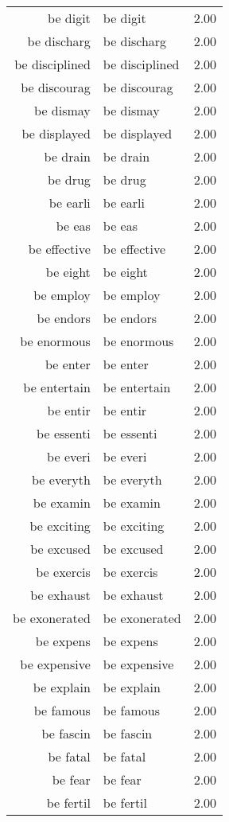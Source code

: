 \begin{table}[ht]
\begin{tabular}{rlr}
  be digit & be digit & 2.00 \\ 
  be discharg & be discharg & 2.00 \\ 
  be disciplined & be disciplined & 2.00 \\ 
  be discourag & be discourag & 2.00 \\ 
  be dismay & be dismay & 2.00 \\ 
  be displayed & be displayed & 2.00 \\ 
  be drain & be drain & 2.00 \\ 
  be drug & be drug & 2.00 \\ 
  be earli & be earli & 2.00 \\ 
  be eas & be eas & 2.00 \\ 
  be effective & be effective & 2.00 \\ 
  be eight & be eight & 2.00 \\ 
  be employ & be employ & 2.00 \\ 
  be endors & be endors & 2.00 \\ 
  be enormous & be enormous & 2.00 \\ 
  be enter & be enter & 2.00 \\ 
  be entertain & be entertain & 2.00 \\ 
  be entir & be entir & 2.00 \\ 
  be essenti & be essenti & 2.00 \\ 
  be everi & be everi & 2.00 \\ 
  be everyth & be everyth & 2.00 \\ 
  be examin & be examin & 2.00 \\ 
  be exciting & be exciting & 2.00 \\ 
  be excused & be excused & 2.00 \\ 
  be exercis & be exercis & 2.00 \\ 
  be exhaust & be exhaust & 2.00 \\ 
  be exonerated & be exonerated & 2.00 \\ 
  be expens & be expens & 2.00 \\ 
  be expensive & be expensive & 2.00 \\ 
  be explain & be explain & 2.00 \\ 
  be famous & be famous & 2.00 \\ 
  be fascin & be fascin & 2.00 \\ 
  be fatal & be fatal & 2.00 \\ 
  be fear & be fear & 2.00 \\ 
  be fertil & be fertil & 2.00 \\ 

\end{tabular}
\end{table}
